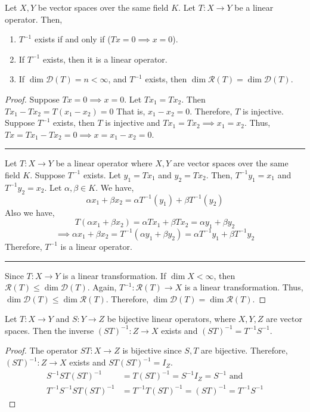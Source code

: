 \begin{theorem}[inverse]
	Let $X,Y$ be vector spaces over the same field $K$.
	Let $T: X \to Y$ be a linear operator.
	Then,
	\begin{enumerate}
		\item $T^{-1}$ exists if and only if ($Tx = 0 \implies x = 0$).
		\item If $T^{-1}$ exists, then it is a linear operator.
		\item If $\dim \mathscr{D}(T) = n < \infty$, and $T^{-1}$ exists, then $\dim \mathscr{R}(T) = \dim \mathscr{D}(T)$.
	\end{enumerate}
	\begin{proof}
		Suppose $Tx = 0 \implies x = 0$.
		Let $Tx_1 = Tx_2$.
		Then $Tx_1 - Tx_2 = T(x_1-x_2) = 0$
		That is, $x_1-x_2 = 0$.
		Therefore, $T$ is injective.
		Suppose $T^{-1}$ exists, then $T$ is injective and $Tx_1 = Tx_2 \implies x_1 = x_2$.
		Thus, $Tx = Tx_1 - Tx_2 = 0 \implies x = x_1 - x_2 = 0$.\\

		\hrule \vspace{1em}

		Let $T : X \to Y$ be a linear operator where $X,Y$ are vector spaces over the same field $K$.
		Suppose $T^{-1}$ exists.
		Let $y_1 = Tx_1$ and $y_2 = Tx_2$.
		Then, $T^{-1}y_1 = x_1$ and $T^{-1}y_2 = x_2$.
		Let $\alpha, \beta \in K$.
		We have, 
		\[ \alpha x_1 + \beta x_2 = \alpha T^{-1}(y_1) + \beta T^{-1}(y_2) \]
		Also we have, 
		\[ T(\alpha x_1 + \beta x_2) = \alpha Tx_1 + \beta Tx_2 = \alpha y_1 + \beta y_2 \]
		\[ \implies \alpha x_1 + \beta x_2 = T^{-1}(\alpha y_1 + \beta y_2) = \alpha T^{-1}y_1 + \beta T^{-1}y_2 \]
		Therefore, $T^{-1}$ is a linear operator.\\

		\hrule \vspace{1em}

		Since $T : X \to Y$ is a linear transformation.
		If $\dim X < \infty$, then $\mathscr{R}(T) \le \dim \mathscr{D}(T)$.
		Again, $T^{-1} : \mathscr{R}(T) \to X$ is a linear transformation.
		Thus, $\dim \mathscr{D}(T) \le \dim \mathscr{R}(T)$.
		Therefore, $\dim \mathscr{D}(T) = \dim \mathscr{R}(T)$.
	\end{proof}
\end{theorem}

\begin{theorem}
	Let $T : X \to Y$ and $S : Y \to Z$ be bijective linear operators, where $X,Y,Z$ are vector spaces.
	Then the inverse $(ST)^{-1} :Z \to X$ exists and $(ST)^{-1} = T^{-1}S^{-1}$.
\end{theorem}
\begin{proof}
	The operator $ST : X \to Z$ is bijective since $S,T$ are bijective.
	Therefore, $(ST)^{-1} : Z \to X$ exists and $ST(ST)^{-1} = I_Z$.
	\begin{align*}
		S^{-1}ST(ST)^{-1} & = T(ST)^{-1} = S^{-1}I_Z = S^{-1} \text{ and} \\
		T^{-1}S^{-1}ST(ST)^{-1} & = T^{-1}T(ST)^{-1} = (ST)^{-1} = T^{-1}S^{-1}
	\end{align*}
\end{proof}

